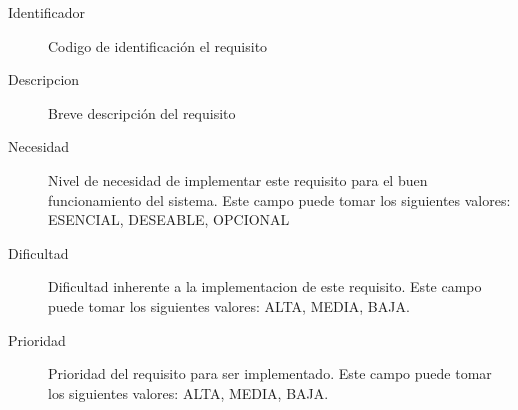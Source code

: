\begin{description}
    \item[Identificador] Codigo de identificación el requisito
    \item[Descripcion] Breve descripción del requisito
    \item[Necesidad] Nivel de necesidad de implementar este requisito para el buen funcionamiento del sistema. Este campo puede tomar los siguientes valores: ESENCIAL, DESEABLE, OPCIONAL
    \item[Dificultad] Dificultad inherente a la implementacion de este requisito. Este campo puede tomar los siguientes valores: ALTA, MEDIA, BAJA.
    \item[Prioridad] Prioridad del requisito para ser implementado. Este campo puede tomar los siguientes valores: ALTA, MEDIA, BAJA.
\end{description}
